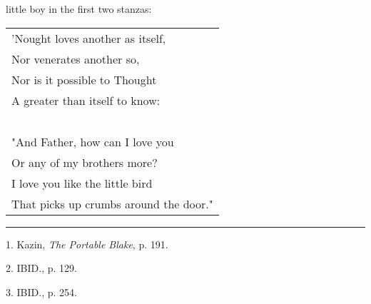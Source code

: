 little boy in the first two stanzas:\par
\begin{center}
	\begin{tabular}{l}
		'Nought loves another as itself, \\
		Nor venerates another so,        \\
		Nor is it possible to Thought    \\
		A greater than itself to know:   \\
		~                                \\
		"And Father, how can I love you  \\
		Or any of my brothers more?      \\
		I love you like the little bird  \\
		That picks up crumbs around the door."
	\end{tabular}
\end{center}
\vspace*{\fill}
\noindent\rule{0.25\textwidth}{0.4pt}\par
1. Kazin, \textit{The Portable Blake}, p. 191.\par
2. IBID., p. 129.\par
3. IBID., p. 254.\par

\newpage

